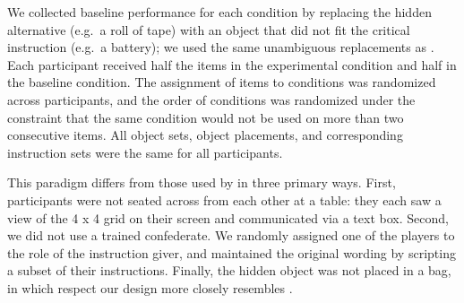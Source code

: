 \documentclass[manuscript]{stjour}
\begin{document}
We collected baseline performance for each condition by replacing the hidden alternative (e.g.~a roll of tape) with an object that did not fit the critical instruction (e.g.~a battery); we used the same unambiguous replacements as \cite{KeysarLinBarr03_LimitsOnTheoryOfMindUse}. Each participant received half the items in the experimental condition and half in the baseline condition. The assignment of items to conditions was randomized across participants, and the order of conditions was randomized under the constraint that the same condition would not be used on more than two consecutive items. All object sets, object placements, and corresponding instruction sets were the same for all participants.

This paradigm differs from those used by \cite{KeysarLinBarr03_LimitsOnTheoryOfMindUse} in three primary ways. First, participants were not seated across from each other at a table: they each saw a view of the 4 x 4 grid on their screen and communicated via a text box. Second, we did not use a trained confederate. We randomly assigned one of the players to the role of the instruction giver, and maintained the original wording by scripting a subset of their instructions. Finally, the hidden object was not placed in a bag, in which respect our design more closely resembles \cite{KeysarBarr___Brauner00_TakingPerspective}.

\end{document}
